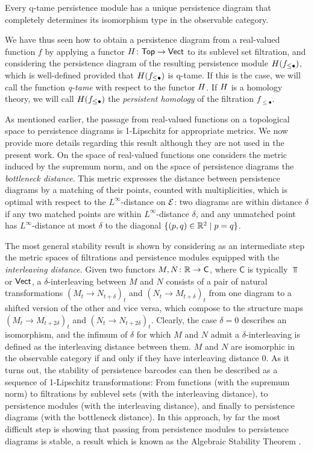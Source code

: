 \begin{thm} \label{t:q-tame modules have barcodes}
	Every q-tame persistence module has a unique persistence diagram that completely determines its isomorphism type in the observable category.
\end{thm}

We have thus seen how to obtain a persistence diagram from a real-valued function $f$ by applying a functor $H \colon \mathsf{Top} \to \mathsf{Vect}$ to its sublevel set filtration, and considering the persistence diagram of the resulting persistence module $H(f_{\leq \bullet})$, which is well-defined provided that $H(f_{\leq \bullet})$ is q-tame.
If this is the case, we will call the function \emph{q-tame} with respect to the functor $H$.
If $H$ is a homology theory, we will call $H(f_{\leq \bullet})$ the \emph{persistent homology} of the filtration $f_{\leq \bullet}$.

As mentioned earlier, the passage from real-valued functions on a topological space to persistence diagrams is 1-Lipschitz for appropriate metrics.
We now provide more details regarding this result although they are not used in the present work.
On the space of real-valued functions one considers the metric induced by the supremum norm, and on the space of persistence diagrams the \emph{bottleneck distance}.
This metric expresses the distance between persistence diagrams by a matching of their points, counted with multiplicities, which is optimal with respect to the $L^{\infty}$-distance on $\mathcal{E}$: two diagrams are within distance $\delta$ if any two matched points are within $L^{\infty}$-distance $\delta$, and any unmatched point has $L^{\infty}$-distance at most $\delta$ to the diagonal $\{(p,q) \in \mathbb{R}^2 \mid p = q\}$.

The most general stability result is shown by considering as an intermediate step the metric spaces of filtrations and persistence modules equipped with the \emph{interleaving distance}.
Given two functors $M,N \colon \mathbb{R} \to \mathsf C$, where $\mathsf C$ is typically $\Top$ or $\mathsf{Vect}$, a $\delta$-interleaving between $M$ and $N$ consists of a pair of natural transformations $(M_t \to N_{t+\delta})_t$ and $(N_t \to M_{t+\delta})_t$ from one diagram to a shifted version of the other and vice versa, which compose to the structure maps $(M_t \to M_{t+2\delta})_t$ and $(N_t \to N_{t+2\delta})_t$.
Clearly, the case $\delta=0$ describes an isomorphism, and the infimum of $\delta$ for which $M$ and $N$ admit a $\delta$-interleaving is defined as the interleaving distance between them.
$M$ and $N$ are isomorphic in the observable category if and only if they have interleaving distance $0$.
As it turns out, the stability of persistence barcodes can then be described as a sequence of 1-Lipschitz transformations: From functions (with the supremum norm) to filtrations by sublevel sets (with the interleaving distance), to persistence modules (with the interleaving distance), and finally to persistence diagrams (with the bottleneck distance).
In this approach, by far the most difficult step is showing that passing from persistence modules to persistence diagrams is stable, a result which is known as the Algebraic Stability Theorem \cite{Chazal.2009, Bauer.2015, Chazal.2016a}.

